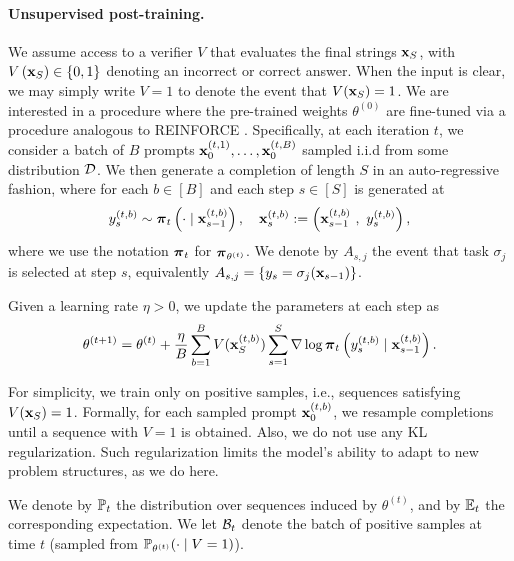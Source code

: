 \documentclass{article}
\theoremstyle{plain}
\theoremstyle{definition}
\theoremstyle{remark}
\begin{document}
\paragraph{Unsupervised post-training.}
We assume access to a verifier $V$ that evaluates the final strings $\bx_{S}$, with $V\left(\bx_{S}\right) \in \{0, 1\}$ denoting an incorrect or correct answer. When the input is clear, we may simply write $V=1$ to denote the event that $V(\bx_S)=1$. We are interested in a procedure where the pre-trained weights $\theta^{(0)}$ are fine-tuned via a procedure analogous to REINFORCE \citep{williams1992simple}. Specifically, at each iteration $t$, we consider a batch of $B$ prompts $\bx^{(t, 1)}_{0}, \ldots, \bx^{(t, B)}_{0}$ sampled i.i.d from some distribution $\Dcal$. We then generate a completion of length $S$ in an auto-regressive fashion, where for each $b\in [B]$ and each step $s\in[S]$ is generated at
\begin{align*}
    y_{s}^{(t, b)} \sim \bpi_t\left(\cdot \mid \bx^{(t, b)}_{s-1}\right) , \quad \bx_{s}^{(t, b)} := \left(\bx^{(t, b)}_{s-1} ~,~ y_{s}^{(t, b)} \right),
\end{align*}
where we use the notation $\bpi_t$ for $\bpi_{\theta^{(t)}}$. We denote by $A_{s,j}$ the event that task $\sigma_j$ is selected at step $s$, equivalently $A_{s,j}=\{y_s=\sigma_j(\bx_{s-1})\}$.

Given a learning rate $\eta > 0$, we update the parameters at each step as
\begin{align*}
    \theta^{(t+1)} = \theta^{(t)} + \frac{\eta}{B} \sum_{b=1}^B V(\bx^{(t,b)}_{S}) \sum_{s=1}^S\nabla \log \bpi_{t}\left(y_{s}^{(t, b)} \mid \bx_{s-1}^{(t, b)}\right).
\end{align*}

For simplicity, we train only on positive samples, i.e., sequences satisfying $V(\bx_{S})=1$. Formally, for each sampled prompt $\bx^{(t,b)}_{0}$, we resample completions until a sequence with $V=1$ is obtained. Also, we do not use any KL regularization. Such regularization limits the model's ability to adapt to new problem structures, as we do here. 


We denote by $\P_t$ the distribution over sequences induced by $\theta^{(t)}$, and by $\E_t$ the corresponding expectation. We let $\Bcal_t$ denote the batch of positive samples at time $t$ (sampled from $\P_{\theta^{(t)}}(\cdot \mid V=1)$). 
\end{document}
